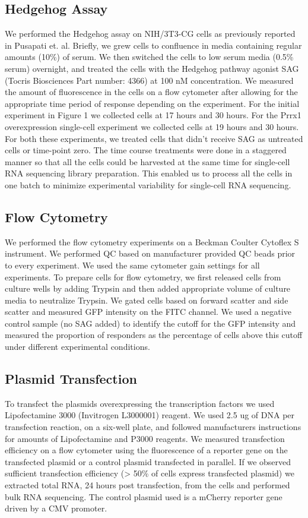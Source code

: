 \subsection{Hedgehog Assay}
We performed the Hedgehog assay on NIH/3T3-CG cells as previously reported in Pusapati et. al. Briefly, we grew cells to confluence in media containing regular amounts (10\%) of serum. We then switched the cells to low serum media (0.5\% serum) overnight, and treated the cells with the Hedgehog pathway agonist SAG (Tocris Biosciences Part number: 4366) at 100 nM concentration. We measured the amount of fluorescence in the cells on a flow cytometer after allowing for the appropriate time period of response depending on the experiment. For the initial experiment in Figure 1 we collected cells at 17 hours and 30 hours. For the Prrx1 overexpression single-cell experiment we collected cells at 19 hours and 30 hours. For both these experiments, we treated cells that didn’t receive SAG as untreated cells or time-point zero. The time course treatments were done in a staggered manner so that all the cells could be harvested at the same time for single-cell RNA sequencing library preparation. This enabled us to process all the cells in one batch to minimize experimental variability for single-cell RNA sequencing. 

\subsection{Flow Cytometry}
We performed the flow cytometry experiments on a Beckman Coulter Cytoflex S instrument. We performed QC based on manufacturer provided QC beads prior to every experiment. We used the same cytometer gain settings for all experiments. To prepare cells for flow cytometry, we first released cells from culture wells by adding Trypsin and then added appropriate volume of culture media to neutralize Trypsin. We gated cells based on forward scatter and side scatter and measured GFP intensity on the FITC channel. We used a negative control sample (no SAG added) to identify the cutoff for the GFP intensity and measured the proportion of responders as the percentage of cells above this cutoff under different experimental conditions.

\subsection{Plasmid Transfection}
To transfect the plasmids overexpressing the transcription factors we used Lipofectamine 3000 (Invitrogen L3000001) reagent. We used 2.5 ug of DNA per transfection reaction, on a six-well plate, and followed manufacturers instructions for amounts of Lipofectamine and P3000 reagents. We measured transfection efficiency on a flow cytometer using the fluorescence of a reporter gene on the transfected plasmid or a control plasmid transfected in parallel. If we observed sufficient transfection efficiency (> 50\% of cells express transfected plasmid) we extracted total RNA, 24 hours post transfection, from the cells and performed bulk RNA sequencing. The control plasmid used is a mCherry reporter gene driven by a CMV promoter.

